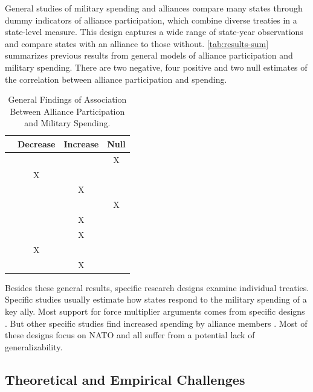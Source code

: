 \documentclass[12pt]{article}
\begin{document}
General studies of military spending and alliances compare many states through dummy indicators of alliance participation, which combine diverse treaties in a state-level measure. 
This design captures a wide range of state-year observations and compare states with an alliance to those without.
\autoref{tab:results-sum} summarizes previous results from general models of alliance participation and military spending. 
There are two negative, four positive and two null estimates of the correlation between alliance participation and spending. 


\begin{table}[hbt!]
\begin{center}
\begin{tabular}{lccc}
     & Decrease & Increase & Null \\
\hline
\citet{MostSiverson1987} &  &  & X \\
\citet{Conybeare1994} & X & &  \\
\citet{Diehl1994} &  & X &  \\
\citet{Goldsmith2003} &  &  & X \\
\citet{MorganPalmer2006} &  & X & \\ 
\citet{QuirozFlores2011} &  & X &  \\ 
\citet{DigiuseppePoast2016} & X &  & \\ 
\citet{Horowitzetal2017} &  & X & \\ 
\hline
\end{tabular}
\caption{General Findings of Association Between Alliance Participation and Military Spending.}
\label{tab:results-sum}
\end{center} 
\end{table}


Besides these general results, specific research designs examine individual treaties. 
Specific studies usually estimate how states respond to the military spending of a key ally. 
Most support for force multiplier arguments comes from specific designs \citep{BarnettLevy1991, Morrow1993, Sorokin1994, PluemperNeumayer2015}. 
But other specific studies find increased spending by alliance members \citep{ConybeareSandler1990, Chenetal1996}. 
Most of these designs focus on NATO and all suffer from a potential lack of generalizability. 


\subsection{Theoretical and Empirical Challenges}
\end{document}
